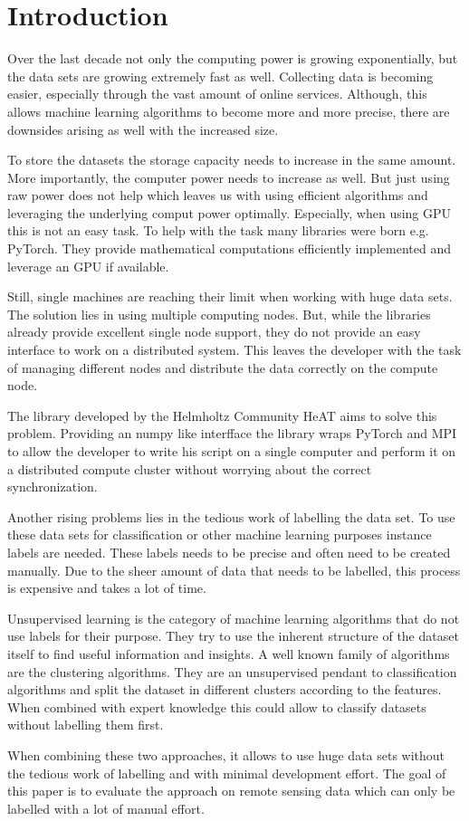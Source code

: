 
\section{Introduction}
\label{sec:intro}
Over the last decade not only the computing power is growing exponentially, but the data sets are growing extremely fast as well.
Collecting data is becoming easier, especially through the vast amount of online services. 
Although, this allows machine learning algorithms to become more and more precise, there are downsides arising as well with
the increased size.

To store the datasets the storage capacity needs to increase in the same amount. More importantly, the computer power needs to increase
as well. But just using raw power does not help which leaves us with using efficient algorithms and leveraging the underlying comput power optimally.
Especially, when using \gls{GPU} this is not an easy task. To help with the task many libraries were born e.g. PyTorch.
They provide mathematical computations efficiently implemented and leverage an \gls{GPU} if available.

Still, single machines are reaching their limit when working with huge data sets. The solution lies in using multiple computing nodes. 
But, while the libraries already provide excellent single node support, they do not provide an easy interface to work on a distributed system.
This leaves the developer with the task of managing different nodes and distribute the data correctly on the compute node.

The library developed by the Helmholtz Community \gls{HeAT} aims to solve this problem.
Providing an \gls{numpy} like interfface the library wraps \gls{PyTorch} and \gls{MPI} to allow the developer to write his script on a single computer
and perform it on a distributed compute cluster without worrying about the correct synchronization.

Another rising problems lies in the tedious work of labelling the data set.
To use these data sets for classification or other machine learning purposes instance labels are needed. 
These labels needs to be precise and often need to be created manually. 
Due to the sheer amount of data that needs to be labelled, this process is expensive and takes a lot of time.

Unsupervised learning is the category of machine learning algorithms that do not use labels for their purpose. They try to
use the inherent structure of the dataset itself to find useful information and insights.
A well known family of algorithms are the clustering algorithms. They are an unsupervised pendant to classification algorithms
and split the dataset in different clusters according to the features. 
When combined with expert knowledge this could allow to classify datasets without labelling them first.

When combining these two approaches, it allows to use huge data sets without the tedious work of labelling and with minimal development effort.
The goal of this paper is to evaluate the approach on remote sensing data which can only be labelled with a lot of manual effort.

